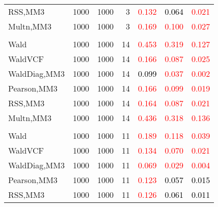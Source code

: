 \documentclass[
]{article}
\begin{document}
\begin{table}[H]
{\begin{tabular}[t]{lrrrrrr}
\hspace{1em}RSS,MM3 & 1000 & 1000 & 3 & \textcolor{red}{0.132} & \textcolor{black}{0.064} & \textcolor{red}{0.021}\\
\hspace{1em}Multn,MM3 & 1000 & 1000 & 3 & \textcolor{red}{0.169} & \textcolor{red}{0.100} & \textcolor{red}{0.027}\\
\addlinespace[0.3em]
\multicolumn{7}{l}{\textbf{1F 15V}}\\
\hspace{1em}Wald & 1000 & 1000 & 14 & \textcolor{red}{0.453} & \textcolor{red}{0.319} & \textcolor{red}{0.127}\\
\hspace{1em}WaldVCF & 1000 & 1000 & 14 & \textcolor{red}{0.166} & \textcolor{red}{0.087} & \textcolor{red}{0.025}\\
\hspace{1em}WaldDiag,MM3 & 1000 & 1000 & 14 & \textcolor{black}{0.099} & \textcolor{red}{0.037} & \textcolor{red}{0.002}\\
\hspace{1em}Pearson,MM3 & 1000 & 1000 & 14 & \textcolor{red}{0.166} & \textcolor{red}{0.099} & \textcolor{red}{0.019}\\
\hspace{1em}RSS,MM3 & 1000 & 1000 & 14 & \textcolor{red}{0.164} & \textcolor{red}{0.087} & \textcolor{red}{0.021}\\
\hspace{1em}Multn,MM3 & 1000 & 1000 & 14 & \textcolor{red}{0.436} & \textcolor{red}{0.318} & \textcolor{red}{0.136}\\
\addlinespace[0.3em]
\multicolumn{7}{l}{\textbf{2F 10V}}\\
\hspace{1em}Wald & 1000 & 1000 & 11 & \textcolor{red}{0.189} & \textcolor{red}{0.118} & \textcolor{red}{0.039}\\
\hspace{1em}WaldVCF & 1000 & 1000 & 11 & \textcolor{red}{0.134} & \textcolor{red}{0.070} & \textcolor{red}{0.021}\\
\hspace{1em}WaldDiag,MM3 & 1000 & 1000 & 11 & \textcolor{red}{0.069} & \textcolor{red}{0.029} & \textcolor{red}{0.004}\\
\hspace{1em}Pearson,MM3 & 1000 & 1000 & 11 & \textcolor{red}{0.123} & \textcolor{black}{0.057} & \textcolor{black}{0.015}\\
\hspace{1em}RSS,MM3 & 1000 & 1000 & 11 & \textcolor{red}{0.126} & \textcolor{black}{0.061} & \textcolor{black}{0.011}\\

\end{tabular}}
\end{table}
\end{document}
